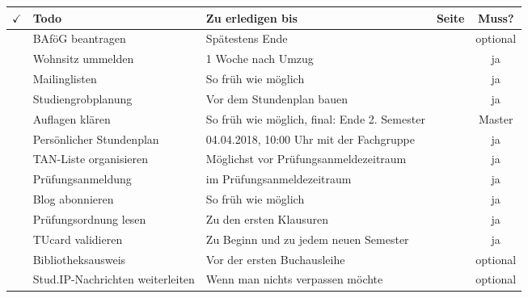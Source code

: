 
\begin{center}
\begin{tabularx}{\textwidth}{|p{3mm}|X|p{7.4cm}|c|c|}
\hline $\checkmark$ 
       & \textbf{Todo}             & \textbf{Zu erledigen bis}                                  & \textbf{Seite}               & \textbf{Muss?} \\ 
\hline & BAföG beantragen          & Spätestens Ende \iftoggle{winter}{Oktober}{April}          & \pageref{todobafoeg}         & optional \\ 
\hline & Wohnsitz ummelden         & 1 Woche nach Umzug                                         & \pageref{todoummelden}       & ja \\
\hline & Mailinglisten             & So früh wie möglich                                        & \pageref{mailinglisten}      & ja \\ 
\hline & Studiengrobplanung        & Vor dem Stundenplan bauen                                  & \pageref{grob}               & ja \\
\hline & Auflagen klären           & So früh wie möglich, final: Ende 2. Semester               & \pageref{auflagen}           & Master \\ 
\hline & Persönlicher Stundenplan  & 04.04.2018, 10:00 Uhr mit der Fachgruppe                   & \pageref{masterstundenplan}  & ja \\ 
\hline & TAN-Liste organisieren    & Möglichst vor Prüfungsanmeldezeitraum                      & \pageref{todoanmeldung}      & ja \\ 
\hline & Prüfungsanmeldung         & im Prüfungsanmeldezeitraum                                 & \pageref{todoanmeldung}      & ja \\ 
\hline & Blog abonnieren           & So früh wie möglich                                        & \pageref{fachgruppe}         & ja \\ 
\hline & Prüfungsordnung lesen     & Zu den ersten Klausuren                                    & \pageref{po}                 & ja \\ 
\hline & TUcard validieren         & Zu Beginn und zu jedem neuen Semester                      & \pageref{tucard}             & ja \\
\hline & Bibliotheksausweis        & Vor der ersten Buchausleihe                                & \pageref{todobib}            & optional \\
\hline & Stud.IP-Nachrichten weiterleiten  & Wenn man nichts verpassen möchte                   & \pageref{studipfwd}          & optional \\
\hline
\end{tabularx} 
\end{center}
